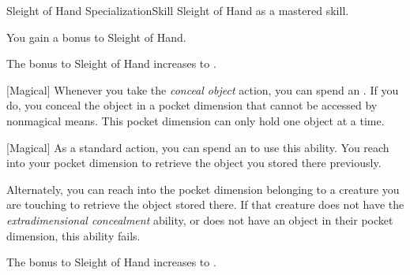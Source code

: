     \begin{feat}{Sleight of Hand Specialization}{Skill}
        \featpre Sleight of Hand as a mastered skill.
        \featben

         You gain a  bonus to Sleight of Hand.

        \ff[2]{}

         The bonus to Sleight of Hand increases to .

        [Magical] Whenever you take the \textit{conceal object} action, you can spend an .
        If you do, you conceal the object in a pocket dimension that cannot be accessed by nonmagical means.
        This pocket dimension can only hold one object at a time.

        [Magical] As a standard action, you can spend an  to use this ability.
        You reach into your pocket dimension to retrieve the object you stored there previously.

        Alternately, you can reach into the pocket dimension belonging to a creature you are touching to retrieve the object stored there.
        If that creature does not have the \textit{extradimensional concealment} ability, or does not have an object in their pocket dimension, this ability fails.

         The bonus to Sleight of Hand increases to .
    \end{feat}

